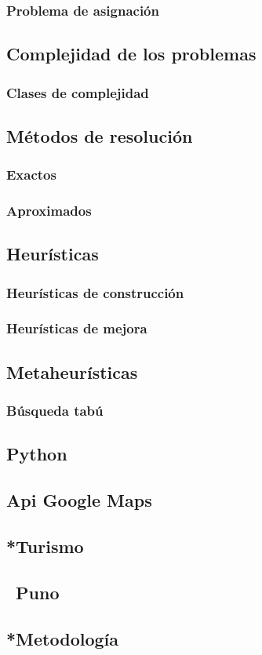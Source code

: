 \subsubsection{Problema de asignación}

\subsection{Complejidad de los problemas}
\subsubsection{Clases de complejidad}

\subsection{Métodos de resolución}
\subsubsection{Exactos}
\subsubsection{Aproximados}

\subsection{Heurísticas}  %
\subsubsection{Heurísticas de construcción}
\subsubsection{Heurísticas de mejora}

\subsection{Metaheurísticas}
\subsubsection{Búsqueda tabú}

\subsection{Python}
\subsection{Api Google Maps}

\subsection{*Turismo}

\subsection{~Puno}

\subsection{*Metodología}
